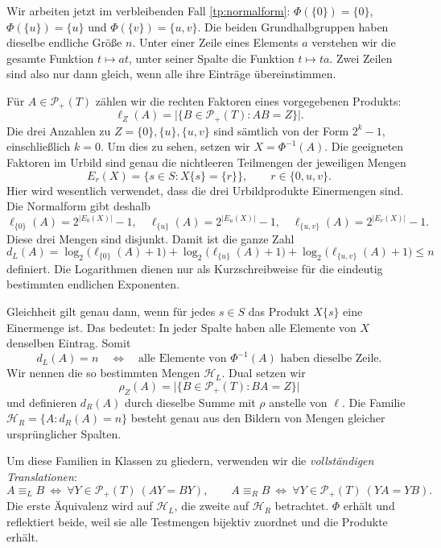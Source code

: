 \documentclass[a4paper,11pt]{article}
\newcommand{\Pp}[1]{\mathcal P_+(#1)}
\newcommand{\HL}{\mathcal H_L}
\newcommand{\HR}{\mathcal H_R}
\theoremstyle{remark}
\begin{document}
Wir arbeiten jetzt im verbleibenden Fall \eqref{tp:normalform}:
\(\Phi(\{0\})=\{0\}\), \(\Phi(\{u\})=\{u\}\) und
\(\Phi(\{v\})=\{u,v\}\). Die beiden Grundhalbgruppen haben dieselbe
endliche Größe \(n\). Unter einer Zeile eines Elements \(a\) verstehen
wir die gesamte Funktion \(t\mapsto at\), unter seiner Spalte die
Funktion \(t\mapsto ta\). Zwei Zeilen sind also nur dann gleich, wenn
alle ihre Einträge übereinstimmen.

Für \(A\in\Pp{T}\) zählen wir die rechten Faktoren eines vorgegebenen
Produkts:
\[
 \ell_Z(A)=\bigl|\{B\in\Pp{T}:AB=Z\}\bigr|.
\]
Die drei Anzahlen zu \(Z=\{0\},\{u\},\{u,v\}\) sind sämtlich von
der Form \(2^k-1\), einschließlich \(k=0\). Um dies zu sehen, setzen
wir \(X=\Phi^{-1}(A)\). Die geeigneten Faktoren im Urbild sind genau
die nichtleeren Teilmengen der jeweiligen Mengen
\[
 E_r(X)=\{s\in S:X\{s\}=\{r\}\},\qquad r\in\{0,u,v\}.
\]
Hier wird wesentlich verwendet, dass die drei Urbildprodukte
Einermengen sind. Die Normalform gibt deshalb
\[
 \ell_{\{0\}}(A)=2^{|E_0(X)|}-1,\quad
 \ell_{\{u\}}(A)=2^{|E_u(X)|}-1,\quad
 \ell_{\{u,v\}}(A)=2^{|E_v(X)|}-1.
\]
Diese drei Mengen sind disjunkt. Damit ist die ganze Zahl
\begin{equation}
 d_L(A)=\log_2\bigl(\ell_{\{0\}}(A)+1\bigr)
       +\log_2\bigl(\ell_{\{u\}}(A)+1\bigr)
       +\log_2\bigl(\ell_{\{u,v\}}(A)+1\bigr)
       \le n
 \label{tp:middle-left-degree}
\end{equation}
definiert. Die Logarithmen dienen nur als Kurzschreibweise für die
eindeutig bestimmten endlichen Exponenten.

Gleichheit gilt genau dann, wenn für jedes \(s\in S\) das Produkt
\(X\{s\}\) eine Einermenge ist. Das bedeutet: In jeder Spalte haben
alle Elemente von \(X\) denselben Eintrag. Somit
\begin{equation}
 d_L(A)=n
 \quad\Longleftrightarrow\quad
 \text{alle Elemente von }\Phi^{-1}(A)\text{ haben dieselbe Zeile}.
 \label{tp:middle-homogeneous-source}
\end{equation}
Wir nennen die so bestimmten Mengen \(\HL\). Dual setzen wir
\[
 \rho_Z(A)=\bigl|\{B\in\Pp{T}:BA=Z\}\bigr|
\]
und definieren \(d_R(A)\) durch dieselbe Summe mit \(\rho\) anstelle
von \(\ell\). Die Familie \(\HR=\{A:d_R(A)=n\}\) besteht genau
aus den Bildern von Mengen gleicher ursprünglicher Spalten.

Um diese Familien in Klassen zu gliedern, verwenden wir die
\emph{vollständigen Translationen}:
\[
 A\equiv_L B\ \Longleftrightarrow\
       \forall Y\in\Pp{T}\ (AY=BY),\qquad
 A\equiv_R B\ \Longleftrightarrow\
       \forall Y\in\Pp{T}\ (YA=YB).
\]
Die erste Äquivalenz wird auf \(\HL\), die zweite auf \(\HR\)
betrachtet. \(\Phi\) erhält und reflektiert beide, weil sie alle
Testmengen bijektiv zuordnet und die Produkte erhält.
\end{document}
